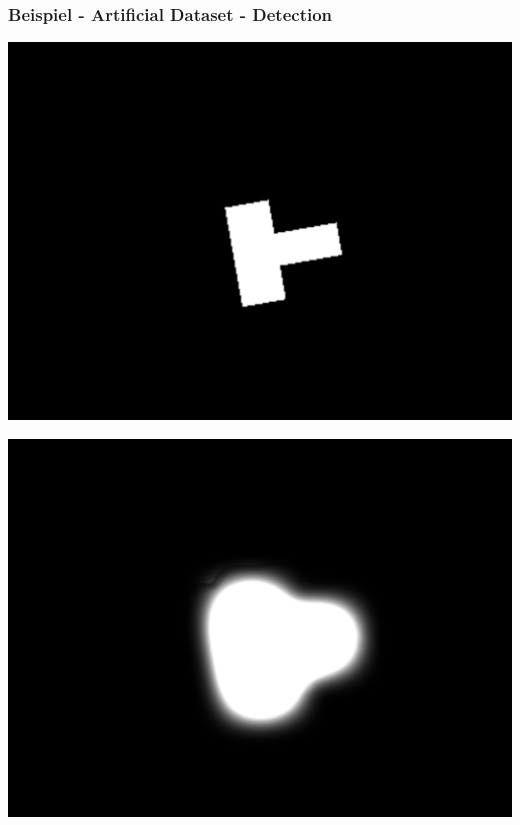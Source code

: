 \begin{frame}
\frametitle{Beispiel - Artificial Dataset - Detection}
\begin{minipage}{0.49\textwidth}
	\includegraphics[width=\linewidth]{../Pictures/RotEqNet2.png}
\end{minipage}
\begin{minipage}{0.49\textwidth}
	\includegraphics[width=\linewidth]{../Pictures/RotEqNet3.png}
\end{minipage}
\end{frame}

